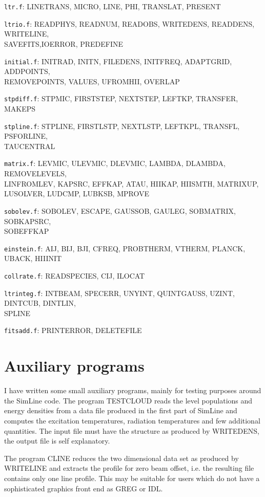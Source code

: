 \begin{description}
\item{} {\tt ltr.f}: LINETRANS, MICRO, LINE, PHI, TRANSLAT, PRESENT
\item{} {\tt ltrio.f}: READPHYS, READNUM, READOBS, WRITEDENS, READDENS, WRITELINE,\\
SAVEFITS,IOERROR, PREDEFINE
\item{} {\tt initial.f}: INITRAD, INITN, FILEDENS, INITFREQ, 
ADAPTGRID, ADDPOINTS,\\ REMOVEPOINTS, VALUES, UFROMHII, OVERLAP
\item{} {\tt stpdiff.f}: STPMIC, FIRSTSTEP, NEXTSTEP, LEFTKP, TRANSFER, MAKEPS
\item{} {\tt stpline.f}: STPLINE, FIRSTLSTP, NEXTLSTP, LEFTKPL, TRANSFL, PSFORLINE,\\ TAUCENTRAL
\item{} {\tt matrix.f}: LEVMIC, ULEVMIC, DLEVMIC, LAMBDA, DLAMBDA, 
REMOVELEVELS,\\ LINFROMLEV, KAPSRC, EFFKAP, ATAU, HIIKAP, 
HIISMTH, MATRIXUP, LUSOLVER, LUDCMP, LUBKSB, MPROVE
\item{} {\tt sobolev.f}: SOBOLEV, ESCAPE, GAUSSOB, GAULEG, 
SOBMATRIX, SOBKAPSRC,\\ SOBEFFKAP
\item{} {\tt einstein.f}:  AIJ, BIJ, BJI, CFREQ,  
PROBTHERM, VTHERM, PLANCK, UBACK, HIIINIT
\item{} {\tt collrate.f}: READSPECIES, CIJ, ILOCAT
\item{} {\tt ltrinteg.f}: INTBEAM, SPECERR, UNYINT, QUINTGAUSS, UZINT, DINTCUB, 
DINTLIN,\\ SPLINE
\item{} {\tt fitsadd.f}: PRINTERROR, DELETEFILE
\end{description}

\section{Auxiliary programs}

I have written some small auxiliary programs, mainly for testing purposes
around the SimLine code. The program TESTCLOUD reads the level populations
and energy densities from a data file produced in the first part of SimLine 
and computes the excitation temperatures, radiation temperatures
and few additional quantities. The input file must have the structure
as produced by WRITEDENS, the output file is self explanatory.

The program CLINE reduces the two dimensional data set as produced by
WRITELINE and extracts the profile for zero beam offset, i.e. the
resulting file contains only one line profile. This may be suitable for
users which do not have a sophisticated graphics front end as GREG
or IDL.

